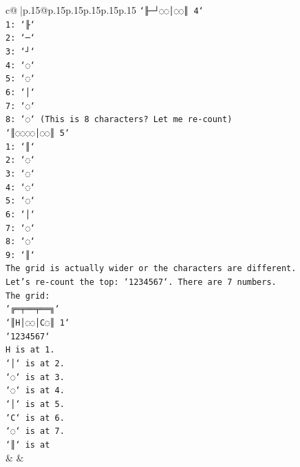 \documentclass{article}
\begin{document}
{\begin{supertabular}{c@{$\;$}|p{.15\linewidth}@{}p{.15\linewidth}p{.15\linewidth}p{.15\linewidth}p{.15\linewidth}p{.15\linewidth}}
{{{\texttt{`╟─┘◌◌│◌◌║ 4`} \\
\texttt{1: `╟`} \\
\texttt{2: `─`} \\
\texttt{3: `┘`} \\
\texttt{4: `◌`} \\
\texttt{5: `◌`} \\
\texttt{6: `│`} \\
\texttt{7: `◌`} \\
\texttt{8: `◌` (This is 8 characters? Let me re{-}count)} \\
\texttt{`║◌◌◌◌│◌◌║ 5`} \\
\texttt{1: `║`} \\
\texttt{2: `◌`} \\
\texttt{3: `◌`} \\
\texttt{4: `◌`} \\
\texttt{5: `◌`} \\
\texttt{6: `│`} \\
\texttt{7: `◌`} \\
\texttt{8: `◌`} \\
\texttt{9: `║`} \\
\texttt{The grid is actually wider or the characters are different.} \\
\texttt{Let's re{-}count the top: `1234567`. There are 7 numbers.} \\
\texttt{The grid:} \\
\texttt{`╔═╤══╤══╗`} \\
\texttt{`║H│◌◌│C◌║ 1`} \\
\texttt{`1234567`} \\
\texttt{H is at 1.} \\
\texttt{`│` is at 2.} \\
\texttt{`◌` is at 3.} \\
\texttt{`◌` is at 4.} \\
\texttt{`│` is at 5.} \\
\texttt{`C` is at 6.} \\
\texttt{`◌` is at 7.} \\
\texttt{`║` is at} \\
            }
        }
    }
    & & \\ \\


\end{supertabular}}
\end{document}

